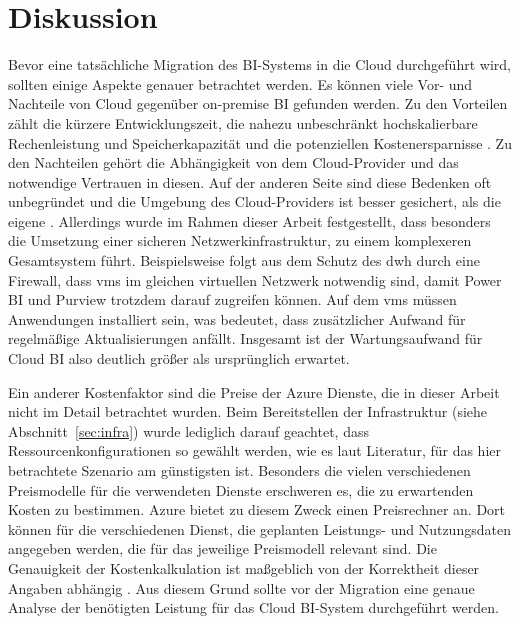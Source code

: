\chapter{Diskussion} \label{ch:diskussion}
Bevor eine tatsächliche Migration des BI-Systems in die Cloud durchgeführt wird, sollten einige Aspekte genauer betrachtet werden. Es können viele Vor- und Nachteile von Cloud gegenüber on-premise BI gefunden werden. Zu den Vorteilen zählt die kürzere Entwicklungszeit, die nahezu unbeschränkt hochskalierbare Rechenleistung und Speicherkapazität und die potenziellen Kostenersparnisse \cite{ouf_cloud_2011}. Zu den Nachteilen gehört die Abhängigkeit von dem Cloud-Provider und das notwendige Vertrauen in diesen. Auf der anderen Seite sind diese Bedenken oft unbegründet und die Umgebung des Cloud-Providers ist besser gesichert, als die eigene \cite{menon_business_2012}. Allerdings wurde im Rahmen dieser Arbeit festgestellt, dass besonders die Umsetzung einer sicheren Netzwerkinfrastruktur, zu einem komplexeren Gesamtsystem führt. Beispielsweise folgt aus dem Schutz des \ac{dwh} durch eine Firewall, dass \acp{vm} im gleichen virtuellen Netzwerk notwendig sind, damit Power BI und Purview trotzdem darauf zugreifen können. Auf dem \acp{vm} müssen Anwendungen installiert sein, was bedeutet, dass zusätzlicher Aufwand für regelmäßige Aktualisierungen anfällt. Insgesamt ist der Wartungsaufwand für Cloud BI also deutlich größer als ursprünglich erwartet.

Ein anderer Kostenfaktor sind die Preise der Azure Dienste, die in dieser Arbeit nicht im Detail betrachtet wurden. Beim Bereitstellen der Infrastruktur (siehe Abschnitt~\ref{sec:infra}) wurde lediglich darauf geachtet, dass Ressourcenkonfigurationen so gewählt werden, wie es laut Literatur, für das hier betrachtete Szenario am günstigsten ist. Besonders die vielen verschiedenen Preismodelle für die verwendeten Dienste erschweren es, die zu erwartenden Kosten zu bestimmen. Azure bietet zu diesem Zweck einen Preisrechner an. Dort können für die verschiedenen Dienst, die geplanten Leistungs- und Nutzungsdaten angegeben werden, die für das jeweilige Preismodell relevant sind. Die Genauigkeit der Kostenkalkulation ist maßgeblich von der Korrektheit dieser Angaben abhängig \cite{modi_azure_2020}. Aus diesem Grund sollte vor der Migration eine genaue Analyse der benötigten Leistung für das Cloud BI-System durchgeführt werden.

